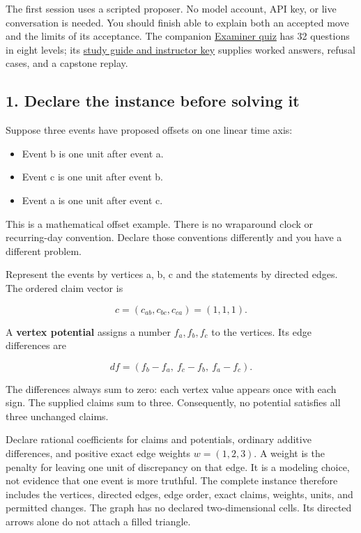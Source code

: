 \documentclass[
  11pt,
]{article}
\providecommand{\tightlist}{%
  \setlength{\itemsep}{0pt}\setlength{\parskip}{0pt}}
\begin{document}
The first session uses a scripted proposer. No model account, API key,
or live conversation is needed. You should finish able to explain both
an accepted move and the limits of its acceptance. The companion
\href{./_lev_examiner_theoretical_minimum_quiz/quiz.md}{Examiner quiz} has
32 questions in eight levels; its
\href{./_lev_examiner_theoretical_minimum_quiz/study_guide.md}{study guide
and instructor key} supplies worked answers, refusal cases, and a
capstone replay.

\hypertarget{declare-the-instance-before-solving-it}{%
\subsection{1. Declare the instance before solving
it}\label{declare-the-instance-before-solving-it}}

Suppose three events have proposed offsets on one linear time axis:

\begin{itemize}
\tightlist
\item
  Event b is one unit after event a.
\item
  Event c is one unit after event b.
\item
  Event a is one unit after event c.
\end{itemize}

This is a mathematical offset example. There is no wraparound clock or
recurring-day convention. Declare those conventions differently and you
have a different problem.

Represent the events by vertices a, b, c and the statements by directed
edges. The ordered claim vector is

\[
c=(c_{ab},c_{bc},c_{ca})=(1,1,1).
\]

A \textbf{vertex potential} assigns a number \(f_a,f_b,f_c\) to the
vertices. Its edge differences are

\[
df=(f_b-f_a,\ f_c-f_b,\ f_a-f_c).
\]

The differences always sum to zero: each vertex value appears once with
each sign. The supplied claims sum to three. Consequently, no potential
satisfies all three unchanged claims.

Declare rational coefficients for claims and potentials, ordinary
additive differences, and positive exact edge weights \(w=(1,2,3)\). A
weight is the penalty for leaving one unit of discrepancy on that edge.
It is a modeling choice, not evidence that one event is more truthful.
The complete instance therefore includes the vertices, directed edges,
edge order, exact claims, weights, units, and permitted changes. The
graph has no declared two-dimensional cells. Its directed arrows alone
do not attach a filled triangle.
\end{document}
